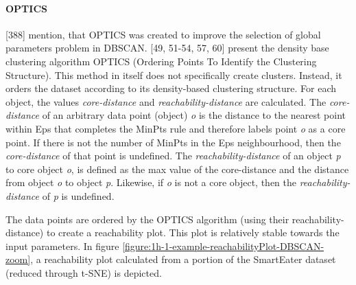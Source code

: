 \paragraph{OPTICS}
\label{section:OPTICS}
\textcite{han2011data}[388] mention, that OPTICS was created to improve the selection of global parameters problem in DBSCAN.
\textcite{OPTICS}[49, 51-54, 57, 60] present the density base clustering algorithm OPTICS (Ordering Points To Identify the Clustering Structure). This method in itself does not specifically create clusters. Instead, it orders the dataset according to its density-based clustering structure. For each object, the values \textit{core-distance} and \textit{reachability-distance} are calculated. The \textit{core-distance} of an arbitrary data point (object) \textit{o} is the distance to the nearest point within Eps that completes the MinPts rule and therefore labels point \textit{o} as a core point. If there is not the number of MinPts in the Eps neighbourhood, then the \textit{core-distance} of that point is undefined. The \textit{reachability-distance} of an object \textit{p} to core object \textit{o}, is defined as the max value of the core-distance and the distance from object \textit{o} to object \textit{p}. Likewise, if \textit{o} is not a core object, then the \textit{reachability-distance} of \textit{p} is undefined. 




The data points are ordered by the OPTICS algorithm (using their reachability-distance) to create a reachability plot. This plot is relatively stable towards the input parameters. In figure \ref{figure:1h-1-example-reachabilityPlot-DBSCAN-zoom}, a reachability plot calculated from a portion of the SmartEater dataset (reduced through t-SNE) is depicted. 



